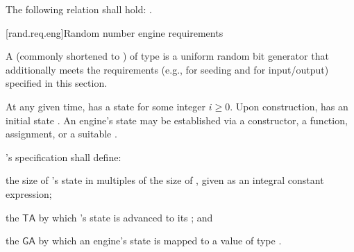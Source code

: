 \pnum
The following relation shall hold:
.
%



[rand.req.eng]{Random number engine requirements}%
%

\pnum
A 
(commonly shortened to )
 of type 
is a uniform random bit generator
that additionally meets the requirements
(e.g., for seeding and for input/output)
specified in this section.

\pnum
At any given time,
 has a state 
for some integer $i \geq 0$.
Upon construction,
has an initial state .
An engine's state may be established via
 a constructor,
 a  function,
 assignment,
 or a suitable .

\pnum
{}'s specification shall define:
\begin{enumeratea}
 \item
   the size of 's state
   in multiples of the size of ,
   given as an integral constant expression;
 \item
   the 
   $ \mathsf{TA} $
   by which 's state 
   is advanced to its 
   ;
 and
 \item
   the 
   $ \mathsf{GA} $
   by which an engine's state is mapped
   to a value of type .
\end{enumeratea}

